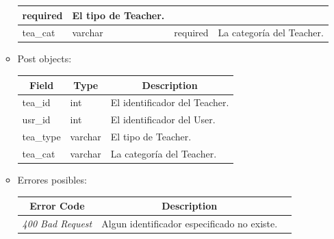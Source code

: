 \documentclass{article}
\begin{document}
\begin{enumerate}
\begin{itemize}
\begin{table}[H]
\begin{tabular}{|l|l|l|l|}
        required & El tipo de Teacher. \\ \hline tea\_cat & varchar & required &
        La categoría del Teacher. \\ \hline \end{tabular} \end{table}
        \item Post objects:
        \begin{table}[H] \centering \begin{tabular}{|l|l|l|} \hline
        \multicolumn{1}{|c|}{\textbf{Field}} &
        \multicolumn{1}{c|}{\textbf{Type}} &
        \multicolumn{1}{c|}{\textbf{Description}} \\ \hline tea\_id & int & El
        identificador del Teacher. \\ \hline usr\_id & int & El identificador
        del User. \\ \hline tea\_type & varchar & El tipo de Teacher. \\ \hline
        tea\_cat & varchar & La categoría del Teacher. \\ \hline \end{tabular}
        \end{table}
        \item Errores posibles: \begin{table}[H] \centering
        \begin{tabular}{|c|c|l|} \hline \textbf{Error Code} &
        \textbf{Description} \\ \hline \textit{400 Bad Request} & Algun
        identificador especificado no existe. \\ \hline \end{tabular}
        \end{table}
    \end{itemize}


\end{enumerate}
\end{document}
